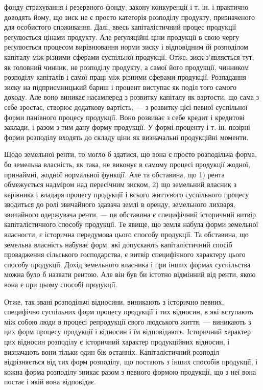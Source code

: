 \parcont{}  %
фонду страхування і резервного фонду, закону конкуренції і т. ін. і практично
доводять йому, що зиск не є просто категорія розподілу продукту, призначеного
для особистого споживання. Далі, ввесь капіталістичний процес продукції реґулюється
цінами продукту. Але реґуляційні ціни продукції в свою чергу реґулюється
процесом вирівнювання норми зиску і відповідним їй розподілом капіталу
між різними сферами суспільної продукції. Отже, зиск з’являється тут, як головний
чинник, не розподілу продукту, а самої його продукції, чинником розподілу
капіталів і самої праці між різними сферами продукції. Розпадання зиску на
підприємницький бариш і процент виступає як поділ того самого доходу. Але воно
виникає насамперед з розвитку капіталу як вартости, що сама з себе зростає, створює
додаткову вартість, — з розвитку цієї певної суспільної форми панівного
процесу продукції. Воно розвиває з себе кредит і кредитові заклади, і разом з
тим дану форму продукції. У формі проценту і т. ін. позірні форми розподілу
входять до складу ціни як визначальні продукційні моменти.

Щодо земельної ренти, то могло б здатися, що вона є просто розподільча
форма, бо земельна власність, як така, не виконує в самому процесі продукції
жодної, принаймні, жодної нормальної функції. Але та обставина, що 1) рента
обмежується надміром над пересічним зиском, 2) що земельний власник з керівника
і владаря процесу продукції і всього життєвого суспільного процесу зводиться
до ролі звичайного здавача землі в оренду, земельного лихваря, звичайного
одержувача ренти, — ця обставина є специфічний історичний витвір капіталістичного
способу продукції. Те явище, що земля набула форми земельної
власности, є історична передумова цього способу продукції. Та обставина, що
земельна власність набуває форм, які допускають капіталістичний спосіб провадження
сільського господарства, є витвір специфічного характеру цього способу
продукції. Дохід земельного власника і при інших формах суспільства
можна було б назвати рентою. Але він був би істотно відмінний від ренти,
якою вона є при цьому способі продукції.

Отже, так звані розподільчі відносини, виникають з історично певних,
специфічно суспільних форм процесу продукції і тих відносин, в які вступають
між собою люди в процесі репродукції свого людського життя, — виникають з цих
форм процесу продукції і відносин і їм відповідають. Історичний характер цих
відносин розподілу є історичний характер продукційних відносин, і визначають вони
тільки один бік останніх. Капіталістичний розподіл відрізняється від тих форм
розподілу, що постають з інших способів продукції, і кожна форма розподілу зникає
разом з певного формою продукції, що з неї вона постає і якій вона відповідає.

